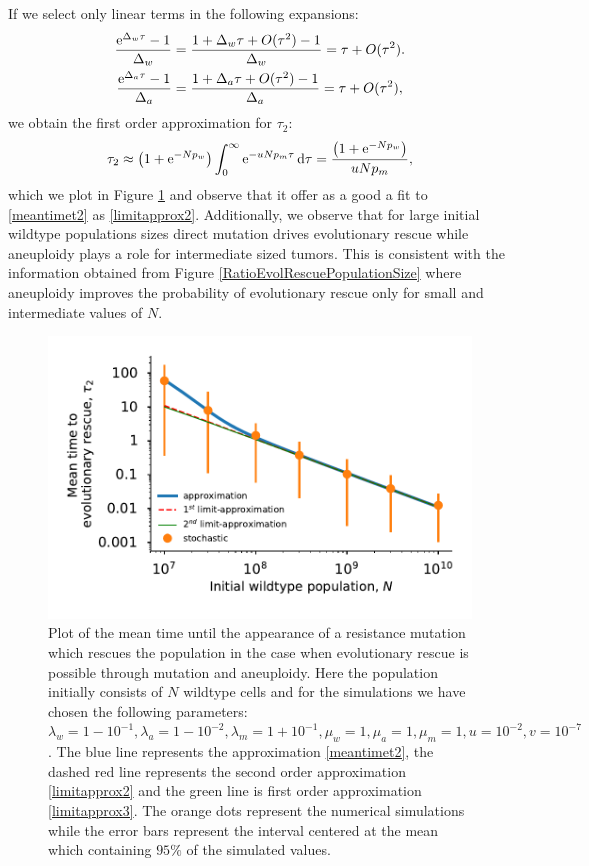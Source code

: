 \documentclass[12pt]{extarticle}
\renewcommand{\d}{{\rm d}}
\newcommand{\e}{{\rm e}}
\begin{document}
If we select only linear terms in the following expansions:
\begin{align*}
\frac{\e^{\Delta_w\tau}-1}{\Delta_w}&=\frac{1+\Delta_w\tau+O(\tau^2)-1}{\Delta_w}=\tau+O(\tau^2).\\
\frac{\e^{\Delta_a\tau}-1}{\Delta_a}&=\frac{1+\Delta_a\tau+O(\tau^2)-1}{\Delta_a}=\tau+O(\tau^2),
\end{align*}
we obtain the first order approximation for $\tau_2$:
\begin{align}\label{limitapprox3}
\tau_2\approx\left(1+\e^{-Np_w}\right)\int_0^\infty\e^{-uNp_m\tau}\,\d\tau=\frac{\left(1+\e^{-Np_w}\right)}{uNp_m},
\end{align}
which we plot in Figure \ref{MeanTimeDeleteriousAneuploidyPlot} and observe that it offer as a good a fit to \eqref{meantimet2} as \eqref{limitapprox2}. Additionally, we observe that for large initial wildtype populations sizes direct mutation drives evolutionary rescue while aneuploidy plays a role for intermediate sized tumors. This is consistent with the information obtained from Figure \ref{RatioEvolRescuePopulationSize} where aneuploidy improves the probability of evolutionary rescue only  for small and intermediate values of $N$.
\begin{figure}[!t]
 \vspace*{1\baselineskip}
\includegraphics[width=1\textwidth]{Figures/MeanTimeDeleteriousPlot.pdf}
\caption{Plot of the mean time until the appearance of a resistance mutation which rescues the population in the case when evolutionary rescue is possible 
 through mutation and aneuploidy.  Here the population initially consists of $N$ wildtype cells and for the simulations we have chosen the following parameters: $\lambda_w=1-10^{-1},\lambda_a=1-10^{-2},\lambda_m=1+10^{-1},\mu_w=1,\mu_a=1,\mu_m=1,u=10^{-2},v=10^{-7}$.  The blue line represents the approximation \eqref{meantimet2}, the dashed red line represents the second order approximation \eqref{limitapprox2} and the green line is first order approximation \eqref{limitapprox3}. The orange dots represent the numerical simulations while the error bars represent the interval centered at the mean which containing $95\%$ of the simulated values.}
\label{MeanTimeDeleteriousAneuploidyPlot}
\end{figure}
\end{document}
